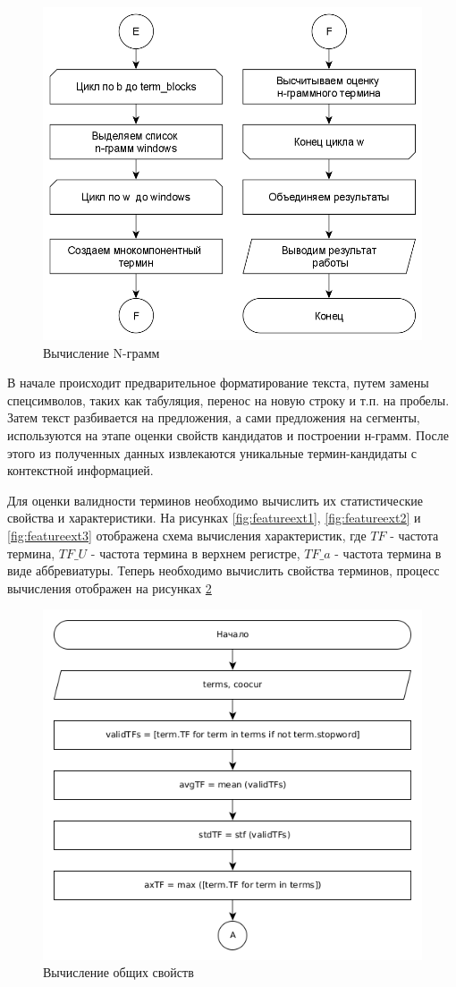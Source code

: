 \begin{figure}[!h]
	\centering
	\includegraphics[width=0.7\linewidth]{src/img/design/yake_3}
	\caption{Вычисление N-грамм}
	\label{fig:yake3}
\end{figure}



В начале происходит предварительное форматирование текста, путем замены спецсимволов, таких как табуляция, перенос на новую строку и т.п. на пробелы.
Затем текст разбивается на предложения, а сами предложения на сегменты, используются на этапе оценки свойств кандидатов и построении н-грамм. 
После этого из полученных данных извлекаются уникальные термин-кандидаты с контекстной информацией.

Для оценки валидности терминов необходимо вычислить их статистические свойства и характеристики.
На рисунках \ref{fig:featureext1}, \ref{fig:featureext2} и \ref{fig:featureext3} отображена схема вычисления характеристик, где $TF$ - частота термина, $TF\_U$ - частота термина в верхнем регистре, $TF\_a$ - частота термина в виде аббревиатуры.
Теперь необходимо вычислить свойства терминов, процесс вычисления отображен на рисунках \ref{fig:calculate1}
\begin{figure}[!h]
	\centering
	\includegraphics[width=0.7\linewidth]{src/img/design/calculate_1}
	\caption{Вычисление общих свойств}
	\label{fig:calculate1}
\end{figure}


